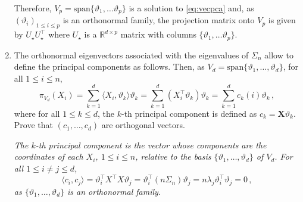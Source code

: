 \documentclass[a4paper,10pt,fleqn]{article}
\newcommand{\eqsp}{\,}
\newcommand{\rset}{\ensuremath{\mathbb{R}}}
\newcommand{\1}{\ensuremath{\mathbbm{1}}}
\newcommand{\bfU}{U}
\newcommand{\bfX}{X}
\newcommand{\bfs}{\Sigma}
\begin{document}
\begin{enumerate}
{Therefore, $V_p = \mathrm{span}\{\vartheta_1,\ldots\vartheta_p\}$ is a solution to \eqref{eq:vecpca} and, as $(\vartheta_i)_{1\leqslant i \leqslant p}$ is an orthonormal family, the projection matrix onto $V_p$ is given by $\bfU_{\star}\bfU^\top_{\star}$ where $\bfU_{\star}$ is a $\rset^{d\times p}$ matrix with columns $\{\vartheta_1,\ldots\vartheta_p\}$.
}
\item The orthonormal eigenvectors associated with the eigenvalues of $\Sigma_n$ allow to define the principal components as follows. Then, as $V_d = \mathrm{span}\{\vartheta_1, \ldots, \vartheta_d\}$, for all $1\leqslant i\leqslant n$,
$$
\pi_{V_d}(X_i) = \sum_{k=1}^d \langle X_i,\vartheta_k\rangle \vartheta_k  = \sum_{k=1}^d (X^\top_i \vartheta_k)\vartheta_k = \sum_{k=1}^d c_k(i)\vartheta_k\eqsp,
$$
where for all $1\leqslant k \leqslant d$, the $k$-th principal component is defined as $c_k = \mathbf{X}\vartheta_k$. Prove that $(c_1,\ldots,c_d)$ are orthogonal vectors.

\vspace{.2cm}

{\em
The $k$-th principal component is the vector whose components are the coordinates of each $X_i$, $1\leqslant i\leqslant n$, relative to the basis $\{\vartheta_1, \ldots, \vartheta_d\}$ of $V_d$. For all $1\leqslant i\neq j \leqslant d$,
$$
\langle c_i,c_j\rangle = \vartheta^\top_i \bfX^\top \bfX \vartheta_j = \vartheta^\top_i(n\Sigma_n)\vartheta_j = n \lambda_j \vartheta^\top_i\vartheta_j = 0\eqsp,
$$
as $\{\vartheta_1, \ldots, \vartheta_d\}$ is an orthonormal family.
}
\end{enumerate}
\end{document}
